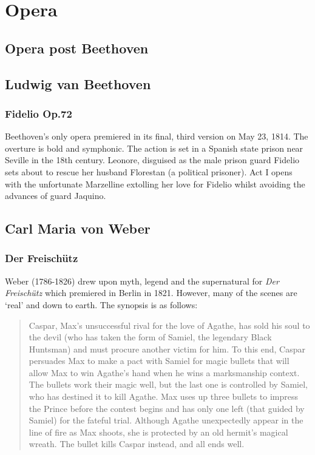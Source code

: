 
\chapter{Opera}
\label{opera}

\section{Opera post Beethoven}


\section{Ludwig van Beethoven}
\subsection{Fidelio Op.72}
Beethoven's only opera premiered in its final, third version on May 23, 1814.  The overture is bold and symphonic. The action is set in a Spanish state prison near Seville in the 18th century. Leonore, disguised as the male prison guard Fidelio sets about to rescue her husband Florestan (a political prisoner). Act I opens with the unfortunate Marzelline extolling her love for Fidelio whilst avoiding the advances of guard Jaquino.      

\section{Carl Maria von Weber}
\subsection{Der Freisch\"utz} 
Weber (1786-1826) drew upon myth, legend and the supernatural for \textit{Der Freisch\"utz} which premiered in Berlin in 1821. However, many of the scenes are `real' and down to earth. The synopsis is as follows:

\begin{quotation}
Caspar, Max's unsuccessful rival for the love of Agathe, has sold his soul to the devil (who has taken the form of Samiel, the legendary Black Huntsman) and must procure another victim for him. To this end, Caspar persuades Max to make a pact with Samiel for magic bullets that will allow Max to win Agathe's hand when he wins a marksmanship context. The bullets work their magic well, but the last one is controlled by Samiel, who has destined it to kill Agathe. Max uses up three bullets to impress the Prince before the contest begins and has only one left (that guided by Samiel) for the fateful trial. Although Agathe unexpectedly appear in the line of fire as Max shoots, she is protected by an old hermit's magical wreath. The bullet kills Caspar instead, and all ends well. \citep[p640]{grout1996history} 
\end{quotation}

